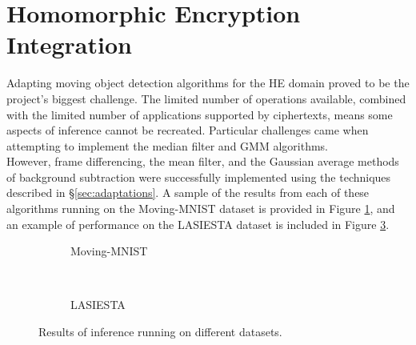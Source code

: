 




\section{Homomorphic Encryption Integration}
\label{sec:integration}
\indent \indent
Adapting moving object detection algorithms for the HE domain proved to be the project's biggest challenge. The limited number of operations available, combined with the limited number of applications supported by ciphertexts, means some aspects of inference cannot be recreated. Particular challenges came when attempting to implement the median filter and GMM algorithms.
\smallskip \\ \indent
However, frame differencing, the mean filter, and the Gaussian average methods of background subtraction were successfully implemented using the techniques described in §\ref{sec:adaptations}. A sample of the results from each of these algorithms running on the Moving-MNIST dataset is provided in Figure \ref{fig:mnistInferenceResults}, and an example of performance on the LASIESTA dataset is included in Figure \ref{fig:lasiestaInferenceResults}.
\begin{figure}
    \centering
    \begin{adjustbox}{minipage=\linewidth,scale=0.495}
        \begin{subfigure}[b]{\textwidth}
            
            \captionsetup{font=LARGE,labelfont=LARGE}
            \caption{Moving-MNIST}
            \label{fig:mnistInferenceResults}
        \end{subfigure}%
    \end{adjustbox}%
    \hfill%
    \begin{adjustbox}{minipage=\linewidth,scale=0.45}
        \begin{subfigure}[b]{\textwidth}\centering
             \\
            \bigskip \bigskip
            \captionsetup{font=LARGE,labelfont=LARGE}
            \caption{LASIESTA}
            \label{fig:lasiestaInferenceResults}
        \end{subfigure}%
    \end{adjustbox}
    \caption[Inference Results]{Results of inference running on different datasets.}
\end{figure}
